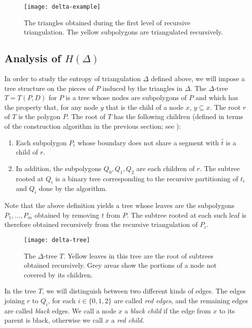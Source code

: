 \documentclass[lotsofwhite]{patmorin}
\newcommand{\z}[1]{{\hat{#1}}}
\begin{document}
\begin{figure}
  \begin{center}
      \texttt{[image: delta-example]}
  \end{center}
  \caption{The triangles obtained during the first level of recursive
triangulation.  The yellow subpolygons are triangulated recursively.}
\end{figure}

\subsection{Analysis of $H(\Delta)$}

In order to study the entropy of triangulation $\Delta$ defined above,
we will impose a tree structure on the pieces of $P$ induced by the
triangles in $\Delta$.  The $\Delta$-tree $T=T(P,D)$ for $P$ is a tree
whose nodes are subpolygons of $P$ and which has the property that,
for any node $y$ that is the child of a node $x$, $y\subseteq x$. The
root $r$ of $T$ is the polygon $P$.  The root of $T$ has the following
children (defined in terms of the construction algorithm in the
previous section; see ):
\begin{enumerate}
\item Each subpolygon $P_i$ whose boundary does not share a segment
      with $\z t$ is a child of $r$.  
\item In addition, the subpolygons $Q_0,Q_1,Q_2$ are each children
     of $r$.  The subtree rooted at $Q_i$ is a binary tree corresponding
     to the recursive partitioning of $t_i$ and $Q_i$ done by the algorithm.
\end{enumerate}
Note that the above definition yields a tree whose leaves are the
subpolygons $P_1,\ldots,P_m$  obtained by removing $t$ from $P$.  The
subtree rooted at each such leaf is therefore obtained recursively
from the recursive triangulation of $P_i$.

\begin{figure}
 \begin{center}\texttt{[image: delta-tree]}\end{center}
   \caption{The $\Delta$-tree $T$.  Yellow leaves in this tree are the
     root of subtrees obtained recursively.  Grey areas show the
portions of a node not covered by its children.}
\end{figure}

In the tree $T$, we will distinguish between two different kinds of
edges.  The edges joining $r$ to $Q_i$, for each $i\in\{0,1,2\}$ are
called \emph{red edges}, and the remaining edges are called
\emph{black} edges.  We call a node $x$ a \emph{black child} if the
edge from $x$ to its parent is black, otherwise we call $x$ a
\emph{red child}.
\end{document}
